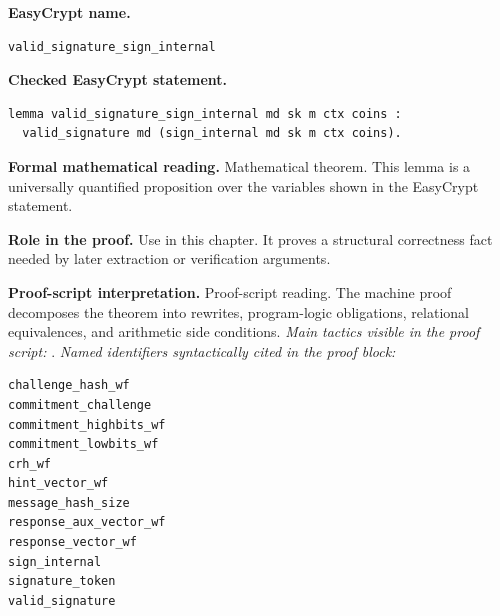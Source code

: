 \begin{formaltheorem}
\noindent\textbf{EasyCrypt name.}
\begin{lstlisting}[language=EasyCrypt,basicstyle=\ttfamily\scriptsize]
valid_signature_sign_internal
\end{lstlisting}
\noindent\textbf{Checked EasyCrypt statement.}
\begin{lstlisting}[language=EasyCrypt,basicstyle=\ttfamily\scriptsize]
lemma valid_signature_sign_internal md sk m ctx coins :
  valid_signature md (sign_internal md sk m ctx coins).
\end{lstlisting}
\noindent\textbf{Formal mathematical reading.}
Mathematical theorem. This lemma is a universally quantified proposition over the variables shown in the EasyCrypt statement.

\noindent\textbf{Role in the proof.}
Use in this chapter. It proves a structural correctness fact needed by later extraction or verification arguments.

\noindent\textbf{Proof-script interpretation.}
Proof-script reading. The machine proof decomposes the theorem into rewrites, program-logic obligations, relational equivalences, and arithmetic side conditions.
\emph{Main tactics visible in the proof script:} .
\emph{Named identifiers syntactically cited in the proof block:}
\begin{lstlisting}[language=EasyCrypt,basicstyle=\ttfamily\scriptsize]
challenge_hash_wf
commitment_challenge
commitment_highbits_wf
commitment_lowbits_wf
crh_wf
hint_vector_wf
message_hash_size
response_aux_vector_wf
response_vector_wf
sign_internal
signature_token
valid_signature
\end{lstlisting}

\end{formaltheorem}

